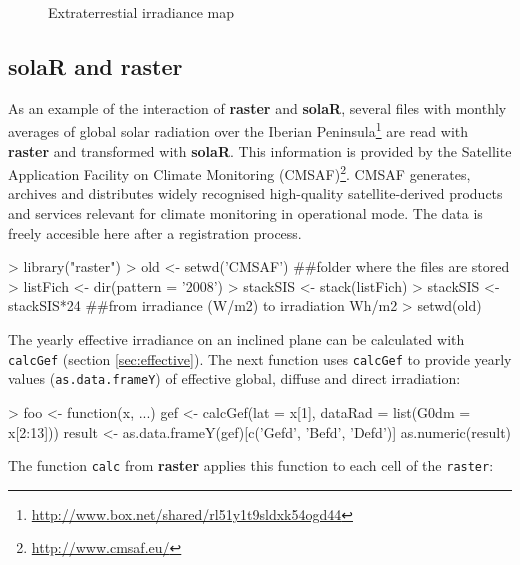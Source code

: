 \documentclass[a4paper]{article}
\renewenvironment{Schunk}{\vspace{\topsep}}{\vspace{\topsep}}
\newcommand{\code}[1]{{\texttt{#1}}}
\newcommand{\pkg}[1]{{\textbf{#1}}}
\begin{document}
\begin{figure}
  \centering
  \caption{Extraterrestial irradiance map}
  \label{fig:Bo0Map}
\end{figure}

\subsection[raster]{\pkg{solaR} and \pkg{raster}}
\label{sec:raster}


As an example of the interaction of \pkg{raster} and \pkg{solaR},
several files with monthly averages of global solar radiation over the
Iberian
Peninsula\footnote{\url{http://www.box.net/shared/rl51y1t9sldxk54ogd44}}
are read with \pkg{raster} and transformed with \pkg{solaR}. This
information is provided by the Satellite Application Facility on
Climate Monitoring (CMSAF)\footnote{\url{http://www.cmsaf.eu/}}. CMSAF
generates, archives and distributes widely recognised high-quality
satellite-derived products and services relevant for climate
monitoring in operational mode. The data is freely accesible here
after a registration process.


\begin{Schunk}
\begin{Sinput}
> library("raster")
> old <- setwd('CMSAF') ##folder where the files are stored
> listFich <- dir(pattern = '2008')
> stackSIS <- stack(listFich)
> stackSIS <- stackSIS*24 ##from irradiance (W/m2) to irradiation Wh/m2
> setwd(old)
\end{Sinput}
\end{Schunk}

The yearly effective irradiance on an inclined plane can be calculated
with \code{calcGef} (section \ref{sec:effective}). The next function uses \code{calcGef} to provide
yearly values (\code{as.data.frameY}) of effective global, diffuse and
direct irradiation:

\begin{Schunk}
\begin{Sinput}
> foo <- function(x, ...){
               gef <- calcGef(lat = x[1], dataRad = list(G0dm = x[2:13]))
               result <- as.data.frameY(gef)[c('Gefd', 'Befd', 'Defd')]
               as.numeric(result)
  }
\end{Sinput}
\end{Schunk}


The function \code{calc} from \pkg{raster} applies this function to each
cell of the \code{raster}:
\end{document}
